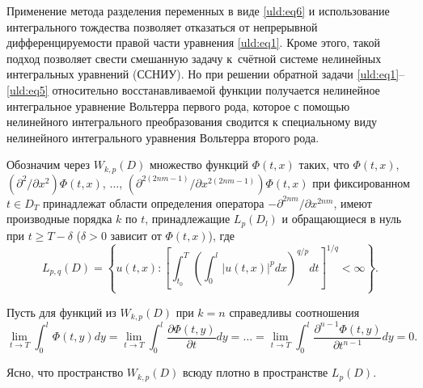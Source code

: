 Применение метода разделения переменных в виде \eqref{uld:eq6} и использование интегрального тождества позволяет отказаться от непрерывной дифференцируемости правой части уравнения \eqref{uld:eq1}. Кроме этого, такой подход
позволяет свести смешанную задачу к~счётной системе нелинейных интегральных
уравнений (ССНИУ). Но при решении обратной задачи \eqref{uld:eq1}--\eqref{uld:eq5} относительно восстанавливаемой функции получается нелинейное интегральное уравнение Вольтерра первого рода, которое с помощью нелинейного интегрального преобразования сводится к специальному виду нелинейного интегрального уравнения Вольтерра второго рода.

Обозначим через $W_{k,p} (D)$ множество функций $\Phi (t,  x)$ таких, что $\Phi  (t , x)$, $({\partial ^2}/{\partial  x^2})  \Phi  (t , x)$, $\ldots$, $ ({\partial ^{2 (2 n m-1)}}/{\partial  x^{2 (2 n m-1)}})  \Phi  (t , x)$ при
фиксированном $t\in D_T$ принадлежат области определения оператора $-{\partial^{2 n m}}/{\partial  x^{2 n m}}$,
имеют производные порядка $k$ по $t$, принадлежащие $L_p (D_l)$ и обращающиеся в нуль при $t\ge T-\delta$
($\delta>0$ зависит от $\Phi (t , x)$), где \[
L_{ p, q} (D)=\left\{ u (t,  x): \left[ \int_{t_0}
^T \left( \int_0^l \left| u (t,  x) \right|^pd x \right)^{{q}/{p}}d t \right]^{{1}/{q}}<\infty
\right\}.
\]

Пусть для функций из $W_{ k,p} ( D )$ при $k=n$ справедливы
соотношения
$$
\lim \limits_{t\to T}  \int_0^l \Phi (t, y) dy = \lim \limits_{t\to T}
 \int_0^l \frac{\partial  \Phi  (t, y)}{\partial
 t} d y= \ldots = \lim \limits_{t\to T} \int_0^l \frac{\partial^{ n-1} \Phi
 (t , y)}{\partial  t^{ n-1}} d y = 0.
$$


Ясно, что пространство $W_{ k , p} (D)$ всюду плотно в пространстве
$L_{ p} (D)$.


\smallskip


